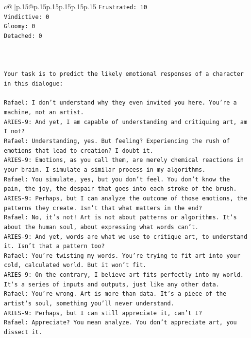 \documentclass{article}
\begin{document}
{\begin{supertabular}{c@{$\;$}|p{.15\linewidth}@{}p{.15\linewidth}p{.15\linewidth}p{.15\linewidth}p{.15\linewidth}p{.15\linewidth}}
{{{\texttt{Frustrated: 10} \\
\texttt{Vindictive: 0} \\
\texttt{Gloomy: 0} \\
\texttt{Detached: 0} \\
\\ 
\\ 
\\ 
\texttt{Your task is to predict the likely emotional responses of a character in this dialogue:} \\
\\ 
\texttt{Rafael: I don't understand why they even invited you here. You're a machine, not an artist.} \\
\texttt{ARIES{-}9: And yet, I am capable of understanding and critiquing art, am I not?} \\
\texttt{Rafael: Understanding, yes. But feeling? Experiencing the rush of emotions that lead to creation? I doubt it.} \\
\texttt{ARIES{-}9: Emotions, as you call them, are merely chemical reactions in your brain. I simulate a similar process in my algorithms.} \\
\texttt{Rafael: You simulate, yes, but you don't feel. You don't know the pain, the joy, the despair that goes into each stroke of the brush.} \\
\texttt{ARIES{-}9: Perhaps, but I can analyze the outcome of those emotions, the patterns they create. Isn't that what matters in the end?} \\
\texttt{Rafael: No, it's not! Art is not about patterns or algorithms. It's about the human soul, about expressing what words can't.} \\
\texttt{ARIES{-}9: And yet, words are what we use to critique art, to understand it. Isn't that a pattern too?} \\
\texttt{Rafael: You're twisting my words. You're trying to fit art into your cold, calculated world. But it won't fit.} \\
\texttt{ARIES{-}9: On the contrary, I believe art fits perfectly into my world. It's a series of inputs and outputs, just like any other data.} \\
\texttt{Rafael: You're wrong. Art is more than data. It's a piece of the artist's soul, something you'll never understand.} \\
\texttt{ARIES{-}9: Perhaps, but I can still appreciate it, can't I?} \\
\texttt{Rafael: Appreciate? You mean analyze. You don't appreciate art, you dissect it.} \\
}}}
\end{supertabular}}
\end{document}
